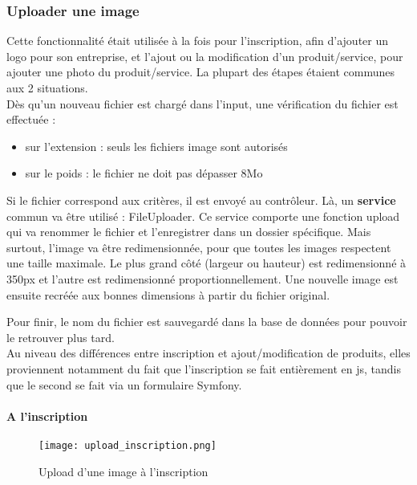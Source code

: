 \subsubsection{Uploader une image}

\label{upload}
Cette fonctionnalité était utilisée à la fois pour l'inscription, afin d'ajouter un logo pour son entreprise, et l'ajout ou la modification d'un produit/service, pour ajouter une photo du produit/service.
La plupart des étapes étaient communes aux 2 situations.\\

Dès qu'un nouveau fichier est chargé dans l'input, une vérification du fichier est effectuée : 
\begin{itemize}
    \item sur l'extension : seuls les fichiers image sont autorisés 
    \item sur le poids : le fichier ne doit pas dépasser 8Mo\\
\end{itemize}

Si le fichier correspond aux critères, il est envoyé au contrôleur. Là, un \textbf{service} commun va être utilisé : FileUploader.
Ce service comporte une fonction upload qui va renommer le fichier et l'enregistrer dans un dossier spécifique. 
Mais surtout, l'image va être redimensionnée, pour que toutes les images respectent une taille maximale.
Le plus grand côté (largeur ou hauteur) est redimensionné à 350px et l'autre est redimensionné proportionnellement.
Une nouvelle image est ensuite recréée aux bonnes dimensions à partir du fichier original.

Pour finir, le nom du fichier est sauvegardé dans la base de données pour pouvoir le retrouver plus tard.\\

Au niveau des différences entre inscription et ajout/modification de produits, elles proviennent notamment du fait que l'inscription se fait entièrement en js, tandis que le second se fait via un formulaire Symfony.

\paragraph*{A l'inscription}

\begin{figure}[H]
    \texttt{[image: upload\_inscription.png]}
    \caption{Upload d'une image à l'inscription}
\end{figure}

